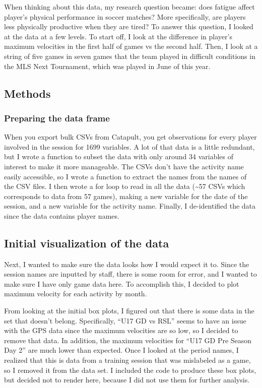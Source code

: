 \documentclass[
  letterpaper,
  DIV=11,
  numbers=noendperiod]{scrartcl}
\begin{document}
When thinking about this data, my research question became: does fatigue
affect player's physical performance in soccer matches? More
specifically, are players less physically productive when they are
tired? To answer this question, I looked at the data at a few levels. To
start off, I look at the difference in player's maximum velocities in
the first half of games vs the second half. Then, I look at a string of
five games in seven games that the team played in difficult conditions
in the MLS Next Tournament, which was played in June of this year.

\hypertarget{methods}{%
\subsection{Methods}\label{methods}}

\hypertarget{preparing-the-data-frame}{%
\subsubsection{Preparing the data
frame}\label{preparing-the-data-frame}}

When you export bulk CSVs from Catapult, you get observations for every
player involved in the session for 1699 variables. A lot of that data is
a little redundant, but I wrote a function to subset the data with only
around 34 variables of interest to make it more manageable. The CSVs
don't have the activity name easily accessible, so I wrote a function to
extract the names from the names of the CSV files. I then wrote a for
loop to read in all the data (\textasciitilde57 CSVs which corresponds
to data from 57 games), making a new variable for the date of the
session, and a new variable for the activity name. Finally, I
de-identified the data since the data contains player names.

\hypertarget{initial-visualization-of-the-data}{%
\subsection{Initial visualization of the
data}\label{initial-visualization-of-the-data}}

Next, I wanted to make sure the data looks how I would expect it to.
Since the session names are inputted by staff, there is some room for
error, and I wanted to make sure I have only game data here. To
accomplish this, I decided to plot maximum velocity for each activity by
month.

From looking at the initial box plots, I figured out that there is some
data in the set that doesn't belong. Specifically, ``U17 GD vs RSL''
seems to have an issue with the GPS data since the maximum velocities
are so low, so I decided to remove that data. In addition, the maximum
velocities for ``U17 GD Pre Season Day 2'' are much lower than expected.
Once I looked at the period names, I realized that this is data from a
training session that was mislabeled as a game, so I removed it from the
data set. I included the code to produce these box plots, but decided
not to render here, because I did not use them for further analysis.
\end{document}
